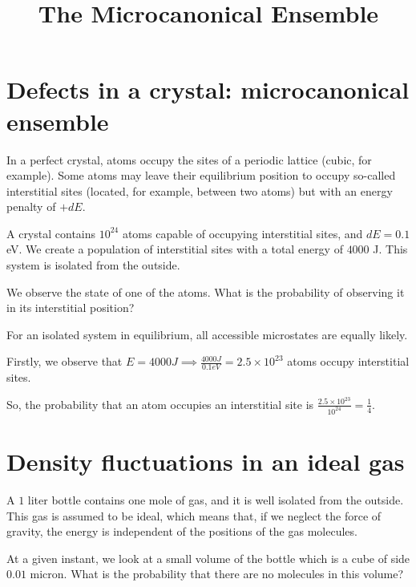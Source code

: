 \documentclass[english]{article}
\begin{document}
	\title{The Microcanonical Ensemble}
	\author{}
	\date{}
	
	\maketitle
	
	\section{Defects in a crystal: microcanonical ensemble}
	\begin{tcolorbox}[colback=blue!5!white,colframe=blue!75!black]
		\quad In a perfect crystal, atoms occupy the sites of a periodic lattice (cubic, for example). Some atoms may leave their equilibrium position to occupy so-called interstitial sites (located, for example, between two atoms) but with an energy penalty of $+dE$.
		
		\quad A crystal contains $10^{24}$ atoms capable of occupying interstitial sites, and $dE=0.1$ eV. We create a population of interstitial sites with a total energy of $4000$ J. This system is isolated from the outside.
		
		\quad We observe the state of one of the atoms. What is the probability of observing it in its interstitial position?
	\end{tcolorbox}

	For an isolated system in equilibrium, all accessible microstates are equally likely.
			
	Firstly, we observe that $E = 4000 J \implies \frac{4000 J}{0.1 eV} = 2.5 \times 10^{23}$ atoms occupy interstitial sites.
	
	So, the probability that an atom occupies an interstitial site is $\frac{2.5 \times 10^{23}}{10^{24}} = \frac{1}{4}$.

	\section{Density fluctuations in an ideal gas}
	\begin{tcolorbox}[colback=blue!5!white,colframe=blue!75!black]
		\quad A $1$ liter bottle contains one mole of gas, and it is well isolated from the outside. This gas is assumed to be ideal, which means that, if we neglect the force of gravity, the energy is independent of the positions of the gas molecules.
		
		\quad At a given instant, we look at a small volume of the bottle which is a cube of side $0.01$ micron. What is the probability that there are no molecules in this volume?
	\end{tcolorbox}
\end{document}
